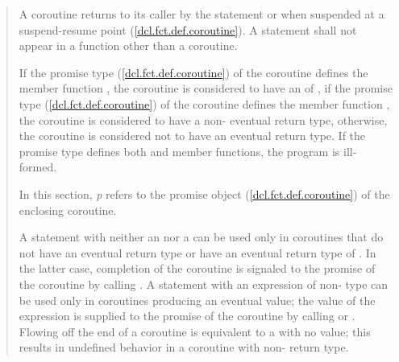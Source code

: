 \begin{quote}

\pnum
A coroutine returns to its caller by the  statement
or when suspended at a suspend-resume point (\ref{dcl.fct.def.coroutine}). A  statement shall not appear in a function other than a coroutine.

\pnum
  If the promise type (\ref{dcl.fct.def.coroutine}) of the coroutine defines the member function , the coroutine is considered to have an  of , if the promise type (\ref{dcl.fct.def.coroutine}) of the coroutine defines the member function , the coroutine is considered to have a non- eventual return  type, otherwise, the coroutine is considered not to have an eventual return type. If the promise type defines both  and  member functions, the program is ill-formed.

\pnum
In this section, \textit{p} refers to the promise object  
(\ref{dcl.fct.def.coroutine})
of the enclosing coroutine.

\pnum
A  statement
with neither an  nor a 
can be used only in coroutines
that do not have an eventual return type or have an eventual return type of . In the latter case, completion of the coroutine
is signaled to the promise of the coroutine by calling .
A  statement with an expression of non- type can be used only
in coroutines producing an eventual value; the value of the expression is supplied to the promise of the coroutine by calling 
 or
. Flowing off the end of a coroutine is equivalent to a  with no value; this results in undefined
behavior in a coroutine with non- return type.


%


\end{quote}
